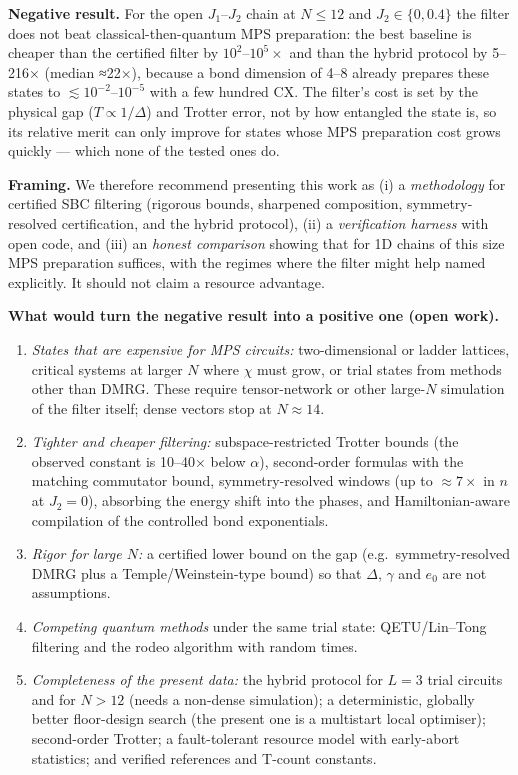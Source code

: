 \documentclass[
]{article}
\providecommand{\tightlist}{%
  \setlength{\itemsep}{0pt}\setlength{\parskip}{0pt}}
\begin{document}
\textbf{Negative result.} For the open \(J_1\)--\(J_2\) chain at
\(N\le12\) and \(J_2\in\{0,0.4\}\) the filter does not beat
classical-then-quantum MPS preparation: the best baseline is cheaper
than the certified filter by \(10^{2}\)--\(10^{5}\times\) and than the
hybrid protocol by 5--216× (median ≈22×), because a bond dimension of
4--8 already prepares these states to \(\lesssim10^{-2}\)--\(10^{-5}\)
with a few hundred CX. The filter's cost is set by the physical gap
(\(T\propto1/\Delta\)) and Trotter error, not by how entangled the state
is, so its relative merit can only improve for states whose MPS
preparation cost grows quickly --- which none of the tested ones do.

\textbf{Framing.} We therefore recommend presenting this work as (i) a
\emph{methodology} for certified SBC filtering (rigorous bounds,
sharpened composition, symmetry-resolved certification, and the hybrid
protocol), (ii) a \emph{verification harness} with open code, and (iii)
an \emph{honest comparison} showing that for 1D chains of this size MPS
preparation suffices, with the regimes where the filter might help named
explicitly. It should not claim a resource advantage.

\textbf{What would turn the negative result into a positive one (open
work).}

\begin{enumerate}
\def\labelenumi{\arabic{enumi}.}
\tightlist
\item
  \emph{States that are expensive for MPS circuits:} two-dimensional or
  ladder lattices, critical systems at larger \(N\) where \(\chi\) must
  grow, or trial states from methods other than DMRG. These require
  tensor-network or other large-\(N\) simulation of the filter itself;
  dense vectors stop at \(N\approx14\).
\item
  \emph{Tighter and cheaper filtering:} subspace-restricted Trotter
  bounds (the observed constant is 10--40× below \(\alpha\)),
  second-order formulas with the matching commutator bound,
  symmetry-resolved windows (up to \(\approx7\times\) in \(n\) at
  \(J_2=0\)), absorbing the energy shift into the phases, and
  Hamiltonian-aware compilation of the controlled bond exponentials.
\item
  \emph{Rigor for large \(N\):} a certified lower bound on the gap
  (e.g.~symmetry-resolved DMRG plus a Temple/Weinstein-type bound) so
  that \(\Delta\), \(\gamma\) and \(e_0\) are not assumptions.
\item
  \emph{Competing quantum methods} under the same trial state:
  QETU/Lin--Tong filtering and the rodeo algorithm with random times.
\item
  \emph{Completeness of the present data:} the hybrid protocol for
  \(L=3\) trial circuits and for \(N>12\) (needs a non-dense
  simulation); a deterministic, globally better floor-design search (the
  present one is a multistart local optimiser); second-order Trotter; a
  fault-tolerant resource model with early-abort statistics; and
  verified references and T-count constants.
\end{enumerate}
\end{document}
